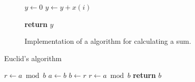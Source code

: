 \documentclass{article}
\begin{document}
\begin{figure}[htb]
    \begin{algorithmic}[1]


        \State $y\gets0$
         
        \State $y\gets y+x(i)$ 
        \EndFor

        \State \textbf{return}  $y$
        \EndProcedure
    \end{algorithmic}
    \caption[Implementation of a algorithm for calculating a sum.]{Implementation of a algorithm for calculating a sum.}
    \label{fig:algorithm1}
\end{figure}

\begin{algorithm}
    \caption{Euclid’s algorithm}\label{euclid}
    \begin{algorithmic}[1]
        \State $r\gets a\bmod b$
        \State $a\gets b$
        \State $b\gets r$
        \State $r\gets a\bmod b$
        \EndWhile\label{euclidendwhile}
        \State \textbf{return} $b$
        \EndProcedure
    \end{algorithmic}
\end{algorithm}
\end{document}
